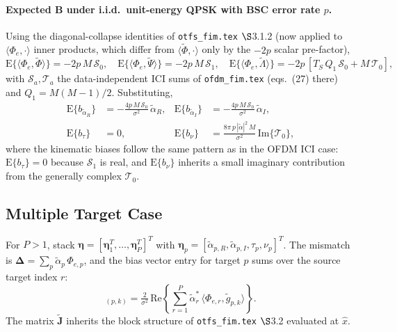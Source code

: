 \documentclass[11pt]{article}
\begin{document}
\paragraph{Expected \(\bm{B}\) under i.i.d.\ unit-energy QPSK with BSC error rate \(p\).} Using the diagonal-collapse identities of \texttt{otfs\_fim.tex} \(\S\)3.1.2 (now applied to \(\langle \Phi_e, \cdot\rangle\) inner products, which differ from \(\langle \tilde\Phi, \cdot \rangle\) only by the \(-2p\) scalar pre-factor),
\begin{equation}
    \mathrm{E}\{\langle \Phi_e, \tilde{\Phi}\rangle\} = -2p\, M\, \mathcal{S}_0, \quad
    \mathrm{E}\{\langle \Phi_e, \tilde{\Psi}\rangle\} = -2p\, M\, \mathcal{S}_1, \quad
    \mathrm{E}\{\langle \Phi_e, \tilde{\Lambda}\rangle\} = -2p\, [T_S\, Q_1\, \mathcal{S}_0 + M\, \mathcal{T}_0],
\end{equation}
with \(\mathcal{S}_a, \mathcal{T}_a\) the data-independent ICI sums of \texttt{ofdm\_fim.tex} (eqs.~(27) there) and \(Q_1 = M(M-1)/2\). Substituting,
\begin{align}
    \mathrm{E}\{b_{\tilde{\alpha}_R}\} &= -\tfrac{4p\, M\, \mathcal{S}_0}{\sigma^2}\, \tilde{\alpha}_R, &
    \mathrm{E}\{b_{\tilde{\alpha}_I}\} &= -\tfrac{4p\, M\, \mathcal{S}_0}{\sigma^2}\, \tilde{\alpha}_I, \\
    \mathrm{E}\{b_\tau\} &= 0, &
    \mathrm{E}\{b_\nu\} &= \tfrac{8\pi\, p\, |\tilde{\alpha}|^2\, M}{\sigma^2}\, \mathrm{Im}\{\mathcal{T}_0\},
\end{align}
where the kinematic biases follow the same pattern as in the OFDM ICI case: \(\mathrm{E}\{b_\tau\} = 0\) because \(\mathcal{S}_1\) is real, and \(\mathrm{E}\{b_\nu\}\) inherits a small imaginary contribution from the generally complex \(\mathcal{T}_0\).

\subsection{Multiple Target Case}

For \(P > 1\), stack \(\bm{\eta} = [\bm{\eta}_1^T, \ldots, \bm{\eta}_P^T]^T\) with \(\bm{\eta}_p = [\tilde{\alpha}_{p,R}, \tilde{\alpha}_{p,I}, \tau_p, \nu_p]^T\). The mismatch is \(\bm{\Delta} = \sum_p \tilde{\alpha}_p\, \Phi_{e,p}\), and the bias vector entry for target \(p\) sums over the source target index \(r\):
\begin{equation}
    [\bm{b}]_{(p,k)} = \tfrac{2}{\sigma^2}\, \mathrm{Re}\!\left\{ \sum_{r=1}^{P} \tilde{\alpha}_r^*\, \langle \Phi_{e,r}, \tilde{g}_{p,k}\rangle \right\}.
\end{equation}
The matrix \(\tilde{\bm{J}}\) inherits the block structure of \texttt{otfs\_fim.tex} \(\S\)3.2 evaluated at \(\hat{x}\).
\end{document}

